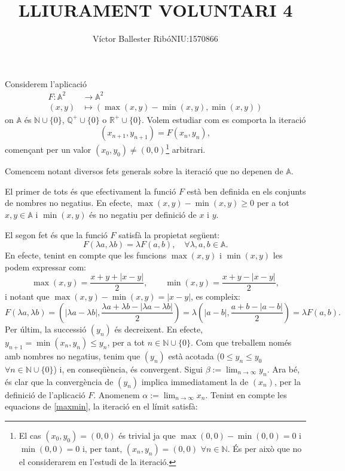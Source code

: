\documentclass[11pt,a4paper]{article}
\title{\bfseries\large LLIURAMENT VOLUNTARI 4}
\author{Víctor Ballester Ribó\endgraf NIU:1570866}
\date{\parbox{\linewidth}{\centering
  Mètodes numèrics\endgraf
  Grau en Matemàtiques\endgraf
  Universitat Autònoma de Barcelona\endgraf
  Abril de 2021}}
\theoremstyle{definition}
\newcommand{\NN}{\ensuremath{\mathbb{N}}}
\newcommand{\QQ}{\ensuremath{\mathbb{Q}}}
\newcommand{\RR}{\ensuremath{\mathbb{R}}}
\begin{document}
\maketitle
Considerem l'aplicació
\begin{align*}
    F:\mathbb{A}^2 & \longrightarrow\mathbb{A}^2                \\
    (x,y)          & \longmapsto(\max(x,y)-\min(x,y),\min(x,y))
\end{align*} on $\mathbb{A}$ és $\NN\cup\{0\}$, $\QQ^+\cup\{0\}$ o $\RR^+\cup\{0\}$. Volem estudiar com es comporta la iteració \begin{equation}
    (x_{n+1},y_{n+1})=F(x_n,y_n),
    \label{iteracio}
\end{equation} començant per un valor $(x_0,y_0)\ne(0,0)$\footnote{El cas $(x_0,y_0)=(0,0)$ és trivial ja que $\max(0,0)-\min(0,0)=0$ i $\min(0,0)=0$ i, per tant, $(x_n,y_n)=(0,0)$ $\forall n\in\NN$. És per això que no el considerarem en l'estudi de la iteració.} arbitrari.\par Comencem notant diversos fets generals sobre la iteració que no depenen de $\mathbb{A}$.\par El primer de tots és que efectivament la funció $F$ està ben definida en els conjunts de nombres no negatius. En efecte, $\max(x,y)-\min(x,y)\geq 0$ per a tot $x,y\in\mathbb{A}$ i $\min(x,y)$ és no negatiu per definició de $x$ i $y$.\par
El segon fet és que la funció $F$ satisfà la propietat següent: $$F(\lambda a,\lambda b)=\lambda F(a,b),\quad\forall\lambda,a,b\in\mathbb{A}.$$ En efecte, tenint en compte que les funcions $\max(x,y)$ i $\min(x,y)$ les podem expressar com:
\begin{equation}
    \max(x,y)=\frac{x+y+|x-y|}{2},\qquad\min(x,y)=\frac{x+y-|x-y|}{2},
    \label{maxmin}
\end{equation} i notant que $\max(x,y)-\min(x,y)=|x-y|$, es compleix:
\begin{equation}
    F(\lambda a,\lambda b)=\left(|\lambda a-\lambda b|,\frac{\lambda a+\lambda b-|\lambda a-\lambda b|}{2}\right)=\lambda \left(|a-b|,\frac{a+b-|a-b|}{2}\right)=\lambda F(a,b).
    \label{eq-lambda}
\end{equation}
Per últim, la successió $(y_n)$ és decreixent. En efecte, $y_{n+1}=\min(x_n,y_n)\leq y_n$, per a tot $n\in\NN\cup\{0\}$. Com que treballem només amb nombres no negatius, tenim que $(y_n)$ està acotada ($0\leq y_n\leq y_0$ $\forall n\in\mathbb{N}\cup\{0\}$) i, en conseqüència, és convergent. Sigui $\displaystyle\beta:=\lim_{n\to\infty}y_n$. Ara bé, és clar que la convergència de $(y_n)$ implica immediatament la de $(x_n)$, per la definició de l'aplicació $F$. Anomenem $\displaystyle\alpha:=\lim_{n\to\infty}x_n$. Tenint en compte les equacions de \eqref{maxmin}, la iteració en el límit satisfà:
\end{document}
